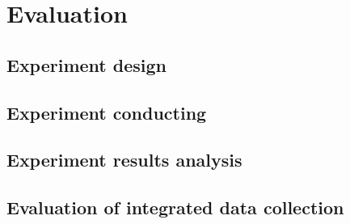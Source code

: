 
\chapter{Evaluation}\label{chapter:evaluation}


\section{Experiment design}\label{section:experiment_design}

\section{Experiment conducting}\label{section:experiment_conducting}

\section{Experiment results analysis}\label{section:experiment_result_analysis}

\section{Evaluation of integrated data collection} \label{section:evaluation}

